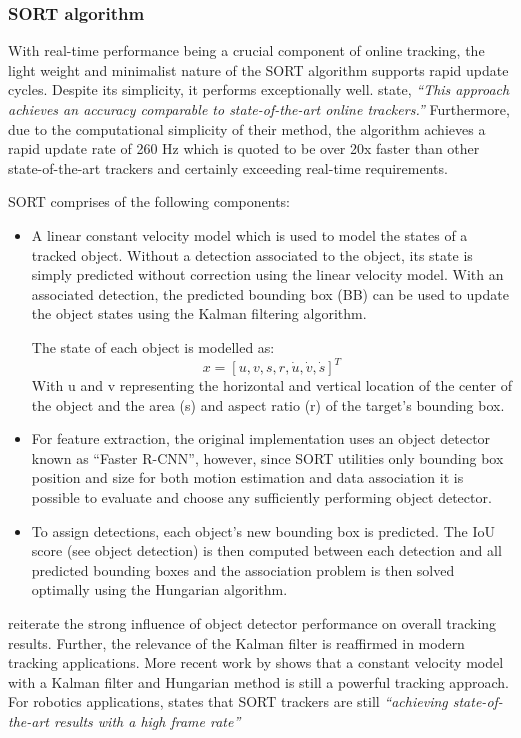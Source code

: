 \documentclass[a4paper,twoside,12pt]{report}
\begin{document}
\subsubsection{SORT algorithm}

With real-time performance being a crucial component of online tracking, the light weight and minimalist nature of the SORT algorithm supports rapid update cycles. Despite its simplicity, it performs exceptionally well. \cite{sort} state, \textit{``This approach achieves an accuracy comparable to state-of-the-art online trackers.''} Furthermore, due to the computational simplicity of their method, the algorithm achieves a rapid update rate of 260 Hz which is quoted to be over 20x faster than other state-of-the-art trackers and certainly exceeding real-time requirements.

SORT comprises of the following components:
\begin{itemize}
	\item A linear constant velocity model which is used to model the states of a tracked object. Without a detection associated to the object, its state is simply predicted without correction using the linear velocity model. With an associated detection, the predicted bounding box (BB) can be used to update the object states using the Kalman filtering algorithm.

	The state of each object is modelled as:
\begin{equation}
x = [u,v,s,r,\dot{u},\dot{v},\dot{s}]^T
\end{equation}
With u and v representing the horizontal and vertical location of the center of the object and the area (s) and aspect ratio (r) of the target’s bounding box.

	\item For feature extraction, the original implementation uses an object detector known as ``Faster R-CNN'', however, since SORT utilities only bounding box position and size for both motion estimation and data association \citep{sort} it is possible to evaluate and choose any sufficiently performing object detector.
	\item To assign detections, each object's new bounding box is predicted. The IoU score (see object detection) is then computed between each detection and all predicted bounding boxes and the association problem is then solved optimally using the Hungarian algorithm.
\end{itemize}

\cite{sort} reiterate the strong influence of object detector performance on overall tracking results. Further, the relevance of the Kalman filter is reaffirmed in modern tracking applications. More recent work by \cite{sort++} shows that a constant velocity model with a Kalman filter and Hungarian method is still a powerful tracking approach. For robotics applications, \cite{sortrob} states that SORT trackers are still \textit{``achieving state-of-the-art results with a high frame rate''} 
\end{document}
